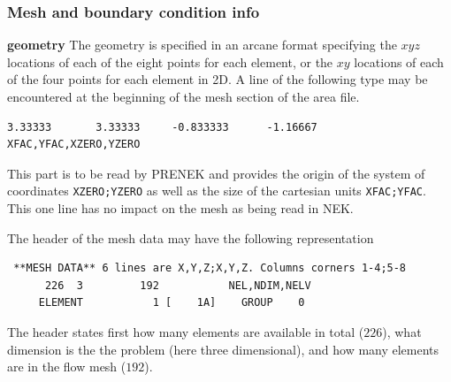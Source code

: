 \subsubsection*{Mesh and boundary condition info} 
\begin{description}
\item{\bf geometry} The geometry is specified in an arcane format specifying
    the \(xyz\) locations of each of the eight points for each element,
    or the \(xy\) locations of each of the four points for each element in 2D.
A line of the following type may be encountered at the beginning of the mesh section of the area file.    
\begin{verbatim}
3.33333       3.33333     -0.833333      -1.16667     XFAC,YFAC,XZERO,YZERO
\end{verbatim}
This part is to be read by PRENEK and provides the origin of the system of coordinates \texttt{XZERO;YZERO} as well as the size of the cartesian units \texttt{XFAC;YFAC}. This one line has no impact on the mesh as being read in NEK. 

The header of the mesh data may have the following representation
\begin{center}
\begin{verbatim} **MESH DATA** 6 lines are X,Y,Z;X,Y,Z. Columns corners 1-4;5-8
      226  3         192           NEL,NDIM,NELV
     ELEMENT           1 [    1A]    GROUP    0
     \end{verbatim}
     \end{center}
The header states first how many elements are available in total (\(226\)), what dimension is the the problem (here three dimensional), and how many elements are in the flow mesh (\(192\)). 



\end{description}

